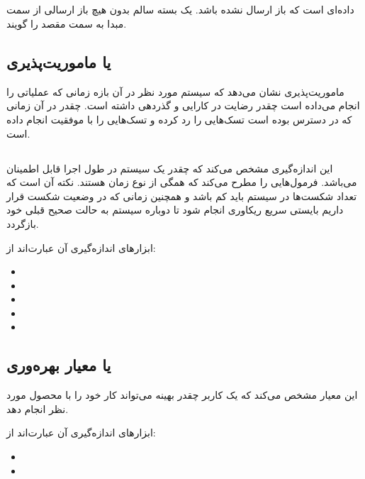 \documentclass[a4paper]{article}
\begin{document}
\subsection{}

داده‌ای است که باز ارسال نشده باشد. یک بسته سالم بدون هیچ باز ارسالی از سمت مبدا
به سمت مقصد را گویند.

\subsection{ یا ماموریت‌پذیری}

ماموریت‌پذیری نشان می‌دهد که سیستم مورد نظر در آن بازه زمانی که عملیاتی را انجام
می‌داده است چقدر رضایت در کارایی و گذردهی داشته است. چقدر در آن زمانی که در
دسترس بوده است تسک‌هایی را رد کرده و تسک‌هایی را با موفقیت انجام داده است.

\subsection{}

این اندازه‌گیری مشخص می‌کند که چقدر یک سیستم در طول اجرا قابل اطمینان می‌باشد.
فرمول‌هایی را مطرح می‌کند که همگی از نوع زمان هستند. نکته آن است که تعداد
شکست‌ها در سیستم باید کم باشد و همچنین زمانی که در وضعیت شکست قرار داریم بایستی
سریع ریکاوری انجام شود تا دوباره سیستم به حالت صحیح قبلی خود بازگردد.

ابزار‌های اندازه‌گیری آن عبارت‌اند از:

\begin{itemize}
    \item {}
    \item {}
    \item {}
    \item {}
    \item {}
\end{itemize}

\subsection{ یا معیار بهره‌وری}

این معیار مشخص می‌کند که یک کاربر چقدر بهینه می‌تواند کار خود را با محصول مورد
نظر انجام دهد.

ابزار‌های اندازه‌گیری آن عبارت‌اند از:

\begin{itemize}
    \item {}
    \item {}
\end{itemize}
\end{document}

